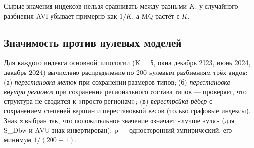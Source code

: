 \documentclass[11pt,a4paper]{article}
\begin{document}
\endgroup

Сырые значения индексов нельзя сравнивать между разными \(K\): у случайного разбиения AVI убывает примерно как \(1/K\), а MQ растёт с \(K\).

\subsection{Значимость против нулевых моделей}\label{ux437ux43dux430ux447ux438ux43cux43eux441ux442ux44c-ux43fux440ux43eux442ux438ux432-ux43dux443ux43bux435ux432ux44bux445-ux43cux43eux434ux435ux43bux435ux439}

Для каждого индекса основной типологии (K = 5, окна декабрь 2023, июнь 2024, декабрь 2024) вычислено распределение по 200 нулевым разбиениям трёх видов: (а) \emph{перестановка меток} при сохранении размеров типов; (б) \emph{перестановка внутри регионов} при сохранении регионального состава типов --- проверяет, что структура не сводится к «просто регионам»; (в) \emph{перестройка рёбер} с сохранением степеней вершин и перестановкой весов (только графовые индексы). Знак z выбран так, что положительное значение означает «лучше нуля» (для S\_Dbw и AVU знак инвертирован); p --- односторонний эмпирический, его минимум \(1/(200+1)\).

\begingroup\small\setlength{\tabcolsep}{4pt}
\end{document}
